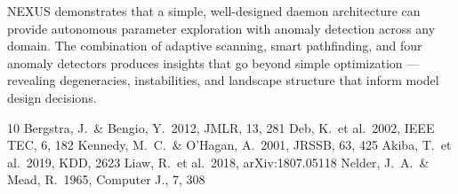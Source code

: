 \documentclass[twocolumn,prd,nofootinbib]{revtex4-2}
\begin{document}
\textsc{NEXUS} demonstrates that a simple, well-designed daemon architecture can provide autonomous parameter exploration with anomaly detection across any domain. The combination of adaptive scanning, smart pathfinding, and four anomaly detectors produces insights that go beyond simple optimization — revealing degeneracies, instabilities, and landscape structure that inform model design decisions.

\begin{thebibliography}{10}
 Bergstra, J.\ \& Bengio, Y.\ 2012, JMLR, 13, 281
 Deb, K.\ et al.\ 2002, IEEE TEC, 6, 182
 Kennedy, M.\ C.\ \& O'Hagan, A.\ 2001, JRSSB, 63, 425
 Akiba, T.\ et al.\ 2019, KDD, 2623
 Liaw, R.\ et al.\ 2018, arXiv:1807.05118
 Nelder, J.\ A.\ \& Mead, R.\ 1965, Computer J., 7, 308
\end{thebibliography}
\end{document}

